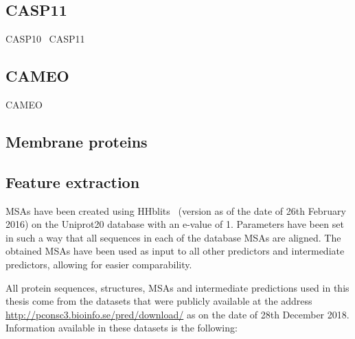   \subsection{CASP11}

    CASP10~\cite{doi:10.1002/prot.24452}
    CASP11~\cite{doi:10.1002/prot.25064}


    \todo{}

  \subsection{CAMEO}

    CAMEO~\cite{haas2013protein}

    \todo{}

  \subsection{Membrane proteins}

    \todo{}

  \subsection{Feature extraction}

    MSAs have been created using HHblits~\cite{HHblits} (version as of the date of 26th February 2016) on the Uniprot20 database
    with an e-value of 1. Parameters have been set in such a way that all sequences in each of the database MSAs are aligned.
    The obtained MSAs have been used as input to all other predictors and intermediate predictors, allowing for easier comparability.

    All protein sequences, structures, MSAs and intermediate predictions used in this thesis come from the datasets that were publicly
    available at the address \url{http://pconsc3.bioinfo.se/pred/download/} as on the date of 28th December 2018.
    Information available in these datasets is the following:


